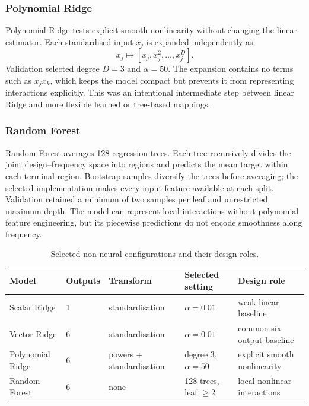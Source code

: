 \subsubsection{Polynomial Ridge}
Polynomial Ridge tests explicit smooth nonlinearity without changing the
linear estimator. Each standardised input $x_j$ is expanded independently as
\begin{equation}
    x_j\mapsto[x_j,x_j^2,\ldots,x_j^D].
    \label{eq:appendix-d-polynomial-map}
\end{equation}
Validation selected degree $D=3$ and $\alpha=50$. The expansion contains no
terms such as $x_jx_k$, which keeps the model compact but prevents it from
representing interactions explicitly. This was an intentional intermediate
step between linear Ridge and more flexible learned or tree-based mappings.

\subsubsection{Random Forest}
Random Forest averages 128 regression trees. Each tree recursively divides the
joint design--frequency space into regions and predicts the mean target within
each terminal region. Bootstrap samples diversify the trees before averaging;
the selected implementation makes every input feature available at each split.
Validation retained a minimum of two samples per leaf and unrestricted maximum
depth. The model can represent local interactions without polynomial feature
engineering, but its piecewise predictions do not encode smoothness along
frequency.

\begin{table}[t]
    \caption{Selected non-neural configurations and their design roles.}
    \label{tab:appendix-d-non-neural}
    \centering
    \scriptsize
    \begin{tabular}{@{}lllll@{}}
        \toprule
        Model & Outputs & Transform & Selected setting & Design role \\
        \midrule
        Scalar Ridge
          & 1 & standardisation & $\alpha=0.01$
          & weak linear baseline \\
        Vector Ridge
          & 6 & standardisation & $\alpha=0.01$
          & common six-output baseline \\
        Polynomial Ridge
          & 6 & powers + standardisation & degree 3, $\alpha=50$
          & explicit smooth nonlinearity \\
        Random Forest
          & 6 & none & 128 trees, leaf $\geq2$
          & local nonlinear interactions \\
        \bottomrule
    \end{tabular}
\end{table}

